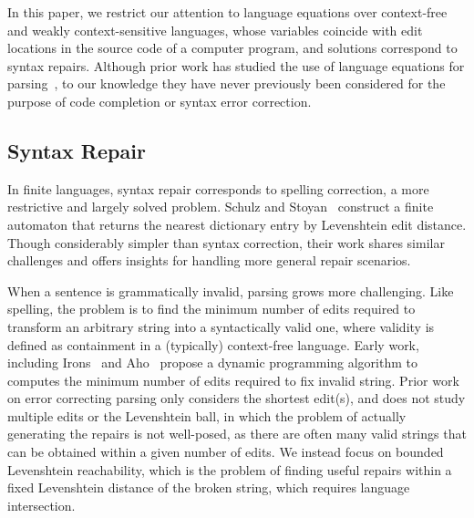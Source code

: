 \documentclass[sigplan,review,anonymous,acmsmall]{acmart}\settopmatter{printfolios=false,printccs=false,printacmref=false}
\begin{document}
In this paper, we restrict our attention to language equations over context-free and weakly context-sensitive languages, whose variables coincide with edit locations in the source code of a computer program, and solutions correspond to syntax repairs. Although prior work has studied the use of language equations for parsing~\cite{might2011parsing}, to our knowledge they have never previously been considered for the purpose of code completion or syntax error correction.



\subsection{Syntax Repair}

In finite languages, syntax repair corresponds to spelling correction, a more restrictive and largely solved problem. Schulz and Stoyan~\cite{schulz2002fast} construct a finite automaton that returns the nearest dictionary entry by Levenshtein edit distance. Though considerably simpler than syntax correction, their work shares similar challenges and offers insights for handling more general repair scenarios.

When a sentence is grammatically invalid, parsing grows more challenging. Like spelling, the problem is to find the minimum number of edits required to transform an arbitrary string into a syntactically valid one, where validity is defined as containment in a (typically) context-free language. Early work, including Irons~\cite{irons1963error} and Aho~\cite{aho1972minimum} propose a dynamic programming algorithm to computes the minimum number of edits required to fix invalid string. Prior work on error correcting parsing only considers the shortest edit(s), and does not study multiple edits or the Levenshtein ball, in which the problem of actually generating the repairs is not well-posed, as there are often many valid strings that can be obtained within a given number of edits. We instead focus on bounded Levenshtein reachability, which is the problem of finding useful repairs within a fixed Levenshtein distance of the broken string, which requires language intersection.
\end{document}
